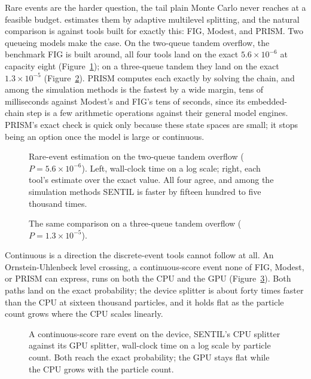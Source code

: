 Rare events are the harder question, the tail plain Monte Carlo never reaches at a feasible budget. \sentil{} estimates them by adaptive multilevel splitting, and the natural comparison is against tools built for exactly this: FIG, Modest, and PRISM. Two queueing models make the case. On the two-queue tandem overflow, the benchmark FIG is built around, all four tools land on the exact $5.6\times10^{-6}$ at capacity eight (Figure~\ref{fig:rare-tandem2}); on a three-queue tandem they land on the exact $1.3\times10^{-5}$ (Figure~\ref{fig:rare-tandem3}). PRISM computes each exactly by solving the chain, and among the simulation methods \sentil{} is the fastest by a wide margin, tens of milliseconds against Modest's and FIG's tens of seconds, since its embedded-chain step is a few arithmetic operations against their general model engines. PRISM's exact check is quick only because these state spaces are small; it stops being an option once the model is large or continuous.

\begin{figure}[H]
\centering
{}
\caption{Rare-event estimation on the two-queue tandem overflow ($P = 5.6\times10^{-6}$). Left, wall-clock time on a log scale; right, each tool's estimate over the exact value. All four agree, and among the simulation methods SENTIL is faster by fifteen hundred to five thousand times.}
\label{fig:rare-tandem2}
\end{figure}

\begin{figure}[H]
\centering
{}
\caption{The same comparison on a three-queue tandem overflow ($P = 1.3\times10^{-5}$).}
\label{fig:rare-tandem3}
\end{figure}

Continuous is a direction the discrete-event tools cannot follow at all. An Ornstein-Uhlenbeck level crossing, a continuous-score event none of FIG, Modest, or PRISM can express, \sentil{} runs on both the CPU and the GPU (Figure~\ref{fig:rare-gpu}). Both paths land on the exact probability; the device splitter is about forty times faster than the CPU at sixteen thousand particles, and it holds flat as the particle count grows where the CPU scales linearly.

\begin{figure}[H]
\centering
\begin{minipage}{0.8\linewidth}\centering{}\end{minipage}
\caption{A continuous-score rare event on the device, SENTIL's CPU splitter against its GPU splitter, wall-clock time on a log scale by particle count. Both reach the exact probability; the GPU stays flat while the CPU grows with the particle count.}
\label{fig:rare-gpu}
\end{figure}

